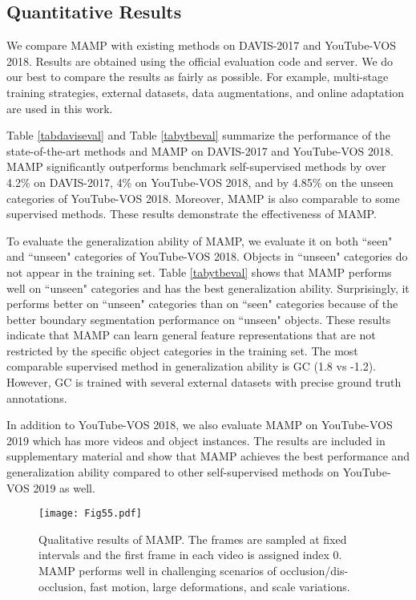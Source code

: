 \documentclass[letterpaper]{article} \usepackage{aaai22}  \usepackage{times}  \usepackage{helvet}  \usepackage{courier}  \usepackage[hyphens]{url}  \usepackage{graphicx} \urlstyle{rm} \def\UrlFont{\rm}  \usepackage{natbib}  \usepackage{caption} \DeclareCaptionStyle{ruled}{labelfont=normalfont,labelsep=colon,strut=off} \frenchspacing  \setlength{\pdfpagewidth}{8.5in}  \setlength{\pdfpageheight}{11in}  \usepackage{algorithm}
\begin{document}
\subsection{Quantitative Results}

We compare MAMP with existing methods on DAVIS-2017 and YouTube-VOS 2018. Results are obtained using the official evaluation code and server. We do our best to compare the results as fairly as possible. For example, multi-stage training strategies, external datasets, data augmentations, and online adaptation are  used in this work.

Table \ref{tabdaviseval} and Table \ref{tabytbeval} summarize the performance of the state-of-the-art methods and MAMP on DAVIS-2017 and YouTube-VOS 2018. MAMP significantly outperforms benchmark self-supervised methods by over 4.2\% on DAVIS-2017, 4\% on YouTube-VOS 2018, and by 4.85\% on the unseen categories of YouTube-VOS 2018. Moreover, MAMP is also comparable to some supervised methods. These results demonstrate the effectiveness of MAMP.

To evaluate the generalization ability of MAMP, we evaluate it on both ``seen" and ``unseen" categories of YouTube-VOS 2018. Objects in ``unseen" categories do not appear in the training set. Table \ref{tabytbeval} shows that MAMP performs well on ``unseen" categories and has the best generalization ability. Surprisingly, it performs better on ``unseen" categories than on ``seen" categories because of the better boundary segmentation performance on ``unseen" objects. These results indicate that MAMP can learn general feature representations that are not restricted by the specific object categories in the training set. The most comparable supervised method in generalization ability is GC \cite{GC} (1.8 vs -1.2). However, GC is trained with several external datasets with precise ground truth annotations.

In addition to YouTube-VOS 2018, we also evaluate MAMP on YouTube-VOS 2019 which has more videos and object instances. The results are included in supplementary material and show that MAMP achieves the best performance and generalization ability compared to other self-supervised methods on YouTube-VOS 2019 as well.

\begin{figure}[t] \centering
\texttt{[image: Fig55.pdf]}
\caption{Qualitative results of MAMP. The frames are sampled at fixed intervals and the first frame in each video is assigned index 0. MAMP performs well in challenging scenarios of occlusion/dis-occlusion, fast motion, large deformations, and scale variations.}
\label{fig:5}
\end{figure}
\end{document}
